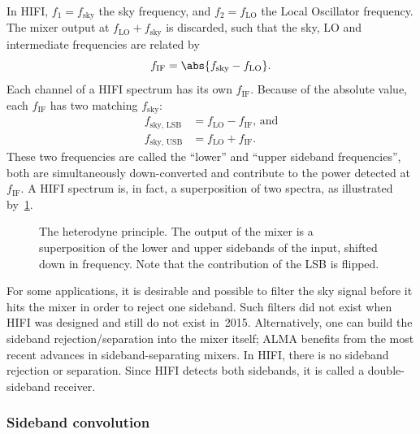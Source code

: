 In HIFI, $f_1=f_\text{sky}$ the sky frequency,
and $f_2=f_\text{LO}$ the Local Oscillator frequency.
The mixer output at $f_\text{LO}+f_\text{sky}$ is discarded, such that
the sky, LO and intermediate frequencies are related by
\begin{equation}
    f_\text{IF} = \abs{f_\text{sky} - f_\text{LO}}\text{.} \label{eq:heterodyne_question}
\end{equation}
Each channel of a HIFI spectrum has its own $f_\text{IF}$.
Because of the absolute value, each $f_\text{IF}$ has two matching $f_\text{sky}$:
\begin{equation}
    \begin{aligned}
        f_\text{sky, LSB} &= f_\text{LO} - f_\text{IF}    \text{, and}    \\
        f_\text{sky, USB} &= f_\text{LO} + f_\text{IF}    \text{.}
    \end{aligned}
    \label{eq:sideband_convolution}
\end{equation}
These two frequencies are called the ``lower'' and ``upper sideband frequencies'', both are simultaneously down-converted and contribute to the power detected at $f_\text{IF}$.
A HIFI spectrum is, in fact, a superposition of two spectra, as illustrated by~\cref{fig:heterodyne_principle}.
\begin{figure}
    \centering
    
    \caption{The heterodyne principle.
        The output of the mixer is a superposition of the lower and upper sidebands of the input, shifted down in frequency.
        Note that the contribution of the LSB is flipped.}
    \label{fig:heterodyne_principle}
\end{figure}

For some applications, it is desirable and possible to filter the sky signal before it hits the mixer in order to reject one sideband.
Such filters did not exist when HIFI was designed and still do not exist in~2015.
Alternatively, one can build the sideband rejection/separation into the mixer itself; ALMA benefits from the most recent advances in sideband-separating mixers.
In HIFI, there is no sideband rejection or separation.
Since HIFI detects both sidebands, it is called a double-sideband receiver.



\subsubsection{Sideband convolution}

